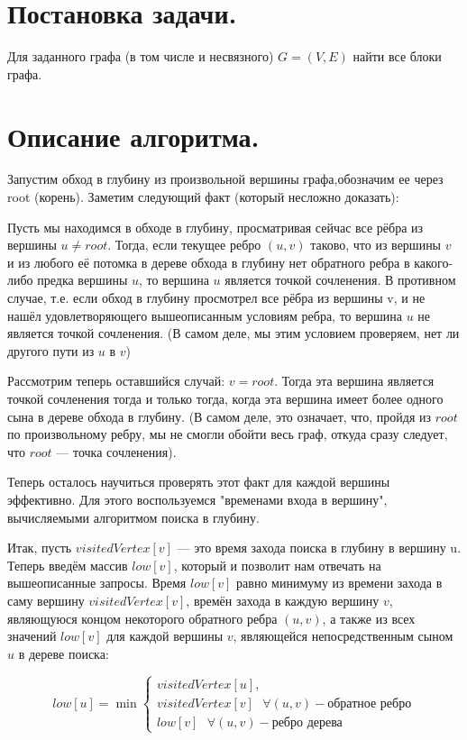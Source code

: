 \documentclass[12pt,a4paper]{scrartcl}
\begin{document}


\newpage
\section{Постановка задачи.}

Для заданного графа (в том числе и несвязного) $G=(V,E)$ найти все блоки графа.

\section{Описание алгоритма.}

Запустим обход в глубину из произвольной вершины графа,обозначим ее через root (корень). Заметим следующий факт (который несложно доказать):

Пусть мы находимся в обходе в глубину, просматривая сейчас все рёбра из вершины $u \neq root$. Тогда, если текущее ребро $(u,v)$ таково, что из вершины $v$ и из любого её потомка в дереве обхода в глубину нет обратного ребра в какого-либо предка вершины $u$, то вершина $u$ является точкой сочленения. В противном случае, т.е. если обход в глубину просмотрел все рёбра из вершины v, и не нашёл удовлетворяющего вышеописанным условиям ребра, то вершина $u$ не является точкой сочленения. (В самом деле, мы этим условием проверяем, нет ли другого пути из $u$ в $v$)

Рассмотрим теперь оставшийся случай: $v = root$. Тогда эта вершина является точкой сочленения тогда и только тогда, когда эта вершина имеет более одного сына в дереве обхода в глубину. (В самом деле, это означает, что, пройдя из $root$ по произвольному ребру, мы не смогли обойти весь граф, откуда сразу следует, что $root$ — точка сочленения).

Теперь осталось научиться проверять этот факт для каждой вершины эффективно. Для этого воспользуемся "временами входа в вершину", вычисляемыми алгоритмом поиска в глубину.

Итак, пусть $visitedVertex[v]$ — это время захода поиска в глубину в вершину u. Теперь введём массив $low[v]$, который и позволит нам отвечать на вышеописанные запросы. Время $low[v]$ равно минимуму из времени захода в саму вершину $visitedVertex[v]$, времён захода в каждую вершину $v$, являющуюся концом некоторого обратного ребра $(u,v)$, а также из всех значений $low[v]$ для каждой вершины $v$, являющейся непосредственным сыном $u$ в дереве поиска:

\[
 low[u] = \min \begin{cases}
                    visitedVertex[u],\\
                    visitedVertex[v]\text{  } \forall (u,v) - \text{обратное ребро}\\
                    low[v]\text{  }  \forall (u,v) - \text{ребро дерева}
                    \end{cases}
\]
\end{document}
